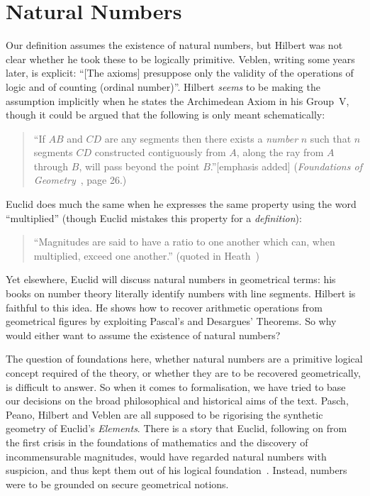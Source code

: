\section{Natural Numbers}
Our definition assumes the existence of natural numbers, but Hilbert was not clear whether he took these to be logically primitive. Veblen, writing some years later, is explicit: ``[The axioms] presuppose only the validity of the operations of logic and of counting (ordinal number)''. Hilbert \emph{seems} to be making the assumption implicitly when he states the Archimedean Axiom in his Group~V, though it could be argued that the following is only meant schematically:
\begin{quote}
  ``If $AB$ and $CD$ are any segments then there exists a \emph{number} $n$ such that $n$ segments $CD$ constructed contiguously from $A$, along the ray from $A$ through $B$, will pass beyond the point $B$.''[emphasis added] (\emph{Foundations of Geometry}~\cite{FoundationsOfGeometry}, page 26.)
\end{quote}

Euclid does much the same when he expresses the same property using the word ``multiplied'' (though Euclid mistakes this property for a \emph{definition}):
\begin{quote}
  ``Magnitudes are said to have a ratio to one another which can, when multiplied, exceed one another.'' (quoted in Heath~\cite{HeathElements})
\end{quote}

Yet elsewhere, Euclid will discuss natural numbers in geometrical terms: his books on number theory literally identify numbers with line segments. Hilbert is faithful to this idea. He shows how to recover arithmetic operations from geometrical figures by exploiting Pascal's and Desargues' Theorems. So why would either want to assume the existence of natural numbers?

The question of foundations here, whether natural numbers are a primitive logical concept required of the theory, or whether they are to be recovered geometrically, is difficult to answer. So when it comes to formalisation, we have tried to base our decisions on the broad philosophical and historical aims of the text. Pasch, Peano, Hilbert and Veblen are all supposed to be rigorising the synthetic geometry of Euclid's \emph{Elements}. There is a story that Euclid, following on from the first crisis in the foundations of mathematics and the discovery of incommensurable magnitudes, would have regarded natural numbers with suspicion, and thus kept them out of his logical foundation~\cite{EvolutionEuclideanElements}. Instead, numbers were to be grounded on secure geometrical notions.

